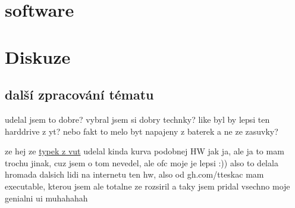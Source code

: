 \documentclass{template/socthesis}
\begin{document}
\chapter{software}

\chapter{Diskuze}
\section{další zpracování tématu}
udelal jsem to dobre? vybral jsem si dobry technky?
like byl by lepsi ten harddrive z yt?
nebo fakt to melo byt napajeny z baterek a ne ze zasuvky?

ze hej ze \href{https://dspace.vutbr.cz/bitstream/handle/11012/38621/final-thesis.pdf?sequence=-1}{typek z vut} udelal kinda kurva podobnej HW jak ja, ale ja to mam trochu jinak, cuz jsem o tom nevedel, ale ofc moje je lepsi :))
also to delala hromada dalsich lidi na internetu ten hw, also od gh.com/tteskac mam executable, kterou jsem ale totalne ze rozsiril a taky jsem pridal vsechno moje genialni ui muhahahah
\end{document}
